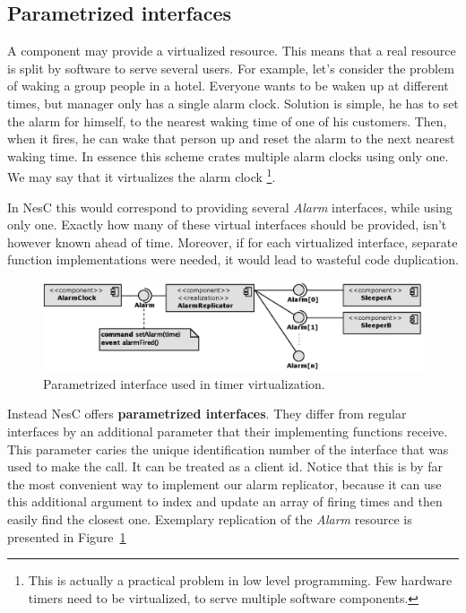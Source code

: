\subsection{Parametrized interfaces}
A component may provide a virtualized resource. This means that a real
resource is split by software to serve several users. For example,
let's consider the problem of waking a group people in a hotel.
Everyone wants to be waken up at different times, but manager only has a
single alarm clock. Solution is simple, he has to set the alarm for
himself, to the nearest waking time of one of his customers. Then, when it
fires, he can wake that person up and reset the alarm to the next
nearest waking time. In essence this scheme crates multiple alarm
clocks using only one. We may say that it virtualizes the alarm clock
\footnote{This is actually a practical problem in low level
programming. Few hardware timers need to be virtualized, to serve
multiple software components.}.

In NesC this would correspond to providing several \emph{Alarm}
interfaces, while using only one. Exactly how many of these virtual
interfaces should be provided, isn't however known ahead of time.
Moreover, if for each virtualized interface, separate function
implementations were needed, it would lead to wasteful code
duplication.

\begin{figure}[h]
  \centering
  \includegraphics[width=1.0\textwidth]{diagrams/parametrized_interface.eps}
  \caption{Parametrized interface used in timer virtualization.}
  \label{fig:parametrized_interface}
\end{figure}

Instead NesC offers {\bf parametrized interfaces}. They differ from
regular interfaces by an additional parameter that their implementing
functions receive. This parameter caries the unique identification
number of the interface that was used to make the call. It can be
treated as a client id.   Notice that this is by far the most
convenient way to implement our alarm replicator, because it can use
this additional argument to index and update an array of firing times
and then easily find the closest one.  Exemplary replication of the
\emph{Alarm} resource is presented in
Figure~\ref{fig:parametrized_interface}
